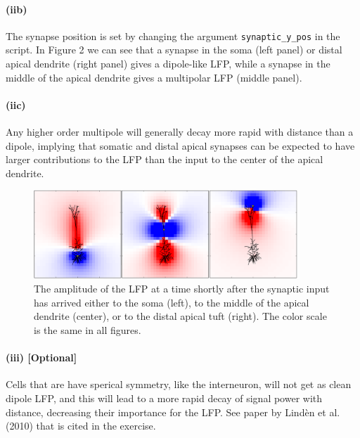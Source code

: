 \documentclass[a4paper,12pt]{article}
\begin{document}
\paragraph{(iib)} The synapse position is set by changing the argument \texttt{synaptic\_y\_pos} in the script. In Figure 2 we can see that a synapse in the soma (left panel) or distal apical dendrite (right panel) gives a dipole-like LFP, while a synapse in the middle of the apical dendrite gives a multipolar LFP (middle panel). 

\paragraph{(iic)} Any higher order multipole will generally decay more rapid with distance than a dipole, implying that somatic and distal apical synapses can be expected to have larger contributions to the LFP than the input to the center of the apical dendrite. 

\begin{figure}[hb]
\centering
\includegraphics[width=10cm]{grid}
\caption{The amplitude of the LFP at a time shortly after the synaptic input has arrived either to the soma (left), to the middle of the apical dendrite (center), or to the distal apical tuft (right). The color scale is the same in 
all figures.}
\end{figure}

\paragraph{(iii) [Optional]} Cells that are have sperical symmetry, like the interneuron, will not get as clean dipole LFP, and this will lead to a more rapid decay of signal power with distance, decreasing their importance for the LFP.
See paper by Lindèn et al. (2010) that is cited in the exercise.
\end{document}
